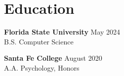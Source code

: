\documentclass[10pt,letterpaper]{article}
\begin{document}
\section*{Education}

\textbf{Florida State University} \hfill May 2024 \\
B.S. Computer Science

\vspace{3pt}

\textbf{Santa Fe College} \hfill August 2020 \\
A.A. Psychology, Honors
\end{document}
